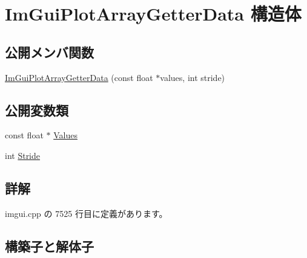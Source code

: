 \hypertarget{struct_im_gui_plot_array_getter_data}{}\section{Im\+Gui\+Plot\+Array\+Getter\+Data 構造体}
\label{struct_im_gui_plot_array_getter_data}
\subsection*{公開メンバ関数}
\begin{DoxyCompactItemize}
\item 
\mbox{\hyperlink{struct_im_gui_plot_array_getter_data_a9c4037621f1c247957c04dc8ae1f2903}{Im\+Gui\+Plot\+Array\+Getter\+Data}} (const float $\ast$values, int stride)
\end{DoxyCompactItemize}
\subsection*{公開変数類}
\begin{DoxyCompactItemize}
\item 
const float $\ast$ \mbox{\hyperlink{struct_im_gui_plot_array_getter_data_aa40ff2e945549744fc622891089ae0fd}{Values}}
\item 
int \mbox{\hyperlink{struct_im_gui_plot_array_getter_data_aecb2cce4ea91d95ec81937de656cfcd6}{Stride}}
\end{DoxyCompactItemize}


\subsection{詳解}


 imgui.\+cpp の 7525 行目に定義があります。



\subsection{構築子と解体子}
\mbox{\label{struct_im_gui_plot_array_getter_data_a9c4037621f1c247957c04dc8ae1f2903}} 
